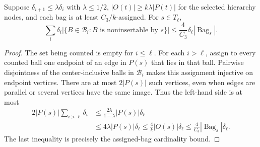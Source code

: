 \begin{lemma}\label{ha:pruning}
Suppose $\delta_{i+1}\le\lambda\delta_i$ with $\lambda\le1/2$,
$|O(t)|\ge k\lambda|P(t)|$ for the selected hierarchy nodes, and each
bag is at least $C_3/k$-assigned.  For $s\in T_\ell$,
\[
 \sum_i\delta_i
   |\{B\in\mathcal B_i:B\text{ is noninsertable by }s\}|
 \le \frac{4}{C_3}\delta_\ell|\operatorname{Bag}_s|.
\]
\end{lemma}
\begin{proof}
The set being counted is empty for $i\le\ell$.  For each $i>\ell$,
assign to every counted ball one endpoint of an edge in $P(s)$ that
lies in that ball.  Pairwise disjointness of the center-inclusive
balls in $\mathcal B_i$ makes this assignment injective on endpoint
vertices.  There are at most $2|P(s)|$ such vertices, even when edges
are parallel or several vertices have the same image.  Thus the
left-hand side is at most
\begin{align*}
 2|P(s)|\sum_{i>\ell}\delta_i
 &\le \frac{2\lambda}{1-\lambda}|P(s)|\delta_\ell\\
 &\le 4\lambda|P(s)|\delta_\ell
 \le \frac{4}{k}|O(s)|\delta_\ell
 \le \frac{4}{C_3}|\operatorname{Bag}_s|\delta_\ell.
\end{align*}
The last inequality is precisely the assigned-bag cardinality bound.
\end{proof}

